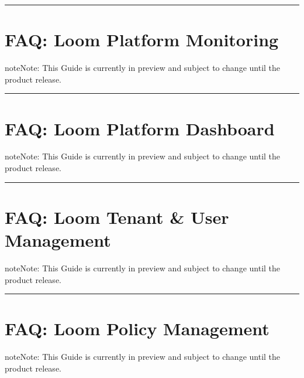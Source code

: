 \documentclass[letterpaper,10pt,english]{sphinxmanual}
\begin{document}
\bigskip\hrule\bigskip



\chapter{FAQ: Loom Platform Monitoring}
\label{\detokenize{loom_trbs_faq:faq-loom-monitoring}}\label{\detokenize{loom_trbs_faq:faq-loom-platform-monitoring}}
\begin{sphinxadmonition}{note}{Note:}
This Guide is currently in preview and subject to change until the product release.
\end{sphinxadmonition}


\bigskip\hrule\bigskip



\chapter{FAQ: Loom Platform Dashboard}
\label{\detokenize{loom_trbs_faq:faq-loom-platform-dashboard}}\label{\detokenize{loom_trbs_faq:faq-loom-dashboard}}
\begin{sphinxadmonition}{note}{Note:}
This Guide is currently in preview and subject to change until the product release.
\end{sphinxadmonition}


\bigskip\hrule\bigskip



\chapter{FAQ: Loom Tenant \& User Management}
\label{\detokenize{loom_trbs_faq:faq-loom-tenant-user-management}}\label{\detokenize{loom_trbs_faq:faq-loom-ten-usr-mngt}}
\begin{sphinxadmonition}{note}{Note:}
This Guide is currently in preview and subject to change until the product release.
\end{sphinxadmonition}


\bigskip\hrule\bigskip



\chapter{FAQ: Loom Policy Management}
\label{\detokenize{loom_trbs_faq:faq-loom-policy-management}}\label{\detokenize{loom_trbs_faq:faq-loom-policy-mngt}}
\begin{sphinxadmonition}{note}{Note:}
This Guide is currently in preview and subject to change until the product release.
\end{sphinxadmonition}
\end{document}
